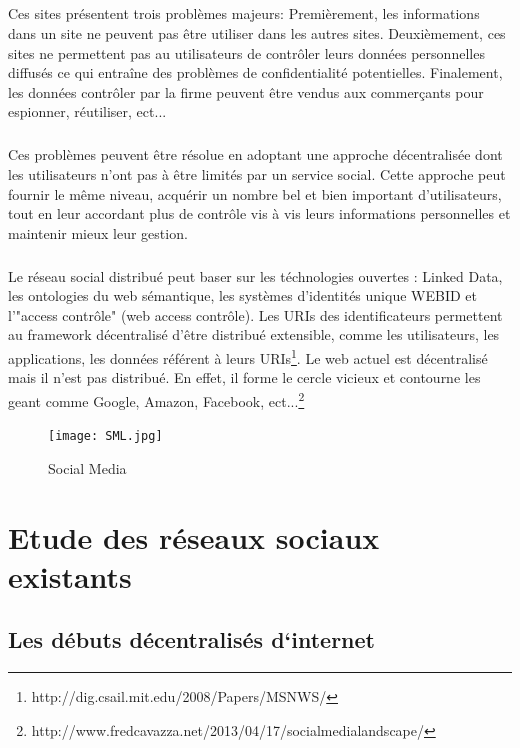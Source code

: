 \subparagraph{}
Ces sites présentent trois problèmes majeurs:\newline
Premièrement, les informations dans un site ne peuvent pas être utiliser dans les autres sites.\newline
Deuxièmement, ces sites ne permettent pas au utilisateurs de contrôler leurs données personnelles diffusés ce qui entraîne des problèmes de confidentialité potentielles.\newline
Finalement, les données contrôler par la firme peuvent être vendus aux commerçants pour espionner, réutiliser, ect... 
\subparagraph{}
Ces problèmes peuvent être résolue en adoptant une approche décentralisée dont les utilisateurs n'ont pas à être limités par un service social.
Cette approche peut fournir le même niveau, acquérir un nombre bel et bien important d'utilisateurs, tout en leur accordant plus de contrôle vis à vis leurs informations personnelles et maintenir mieux leur gestion.
\subparagraph{}
Le réseau social distribué peut baser sur les téchnologies ouvertes : Linked Data, les ontologies du web sémantique, les systèmes d'identités unique WEBID et l'"access contrôle" (web access contrôle).
Les URIs des identificateurs permettent au framework décentralisé d'être distribué extensible, comme les utilisateurs, les applications, les données référent à leurs URIs\footnote{http://dig.csail.mit.edu/2008/Papers/MSNWS/}.
Le web actuel est décentralisé mais il n'est pas distribué. En effet, il forme le cercle vicieux et contourne les geant comme Google, Amazon, Facebook, ect...\footnote{http://www.fredcavazza.net/2013/04/17/social\-media\-landscape/}
\begin{figure}
                \centering
                \texttt{[image: SML.jpg]}
                \caption{Social Media}
                \label{fig:Social Media}      
\end{figure}

\newpage
\section{Etude des réseaux sociaux existants}
\subsection{Les débuts décentralisés d‘internet} 
